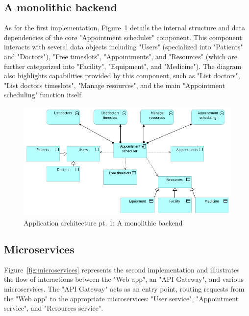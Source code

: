 \documentclass[11pt,english,a4paper,twoside]{article}
\begin{document}
\subsection{A monolithic backend}

As for the first implementation, Figure~\ref{fig:monolith} details the
internal structure and data dependencies of the core "Appointment scheduler"
component. This component interacts with several data objects
including "Users" (specialized into "Patients" and "Doctors"), "Free
timeslots", "Appointments", and "Resources" (which are further categorized
into "Facility", "Equipment", and "Medicine"). The diagram
also highlights capabilities provided by this component, such as "List
doctors", "List doctors timeslots", "Manage resources", and the main
"Appointment scheduling" function itself.

\begin{figure}[H]
    \centering
    \includegraphics[width=\textwidth]{./fig/5. Application Monolith.png}
    \caption{Application architecture pt. 1: A monolithic backend}
    \label{fig:monolith}
\end{figure}

\subsection{Microservices}

Figure~\ref{fig:microservices} represents the second implementation and
illustrates the flow of interactions between the "Web app", an "API Gateway",
and various microservices. The "API Gateway" acts as an entry
point, routing requests from the "Web app" to the appropriate microservices:
"User service", "Appointment service", and "Resources service".
\end{document}
